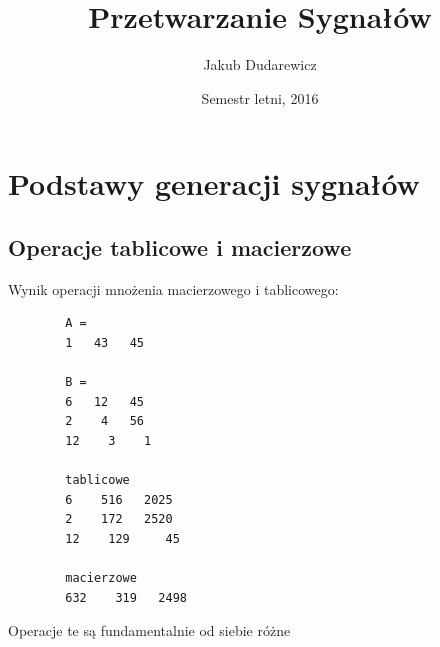\documentclass[12pt,titlepage]{report}
\title{Przetwarzanie Sygnałów}
\author{Jakub Dudarewicz}
\date{Semestr letni, 2016}
\begin{document}
\begin{titlepage}
	\maketitle
\end{titlepage}
	
	\def\thesection{Instrukcja \arabic{section}.\Large}
	\def\thesubsection{Instrukcja \arabic{section}, zadanie \arabic{subsection}\normalsize}
	\def\theparagraph{\normalsize}%
\section{Podstawy generacji sygnałów}
\subsection{Operacje tablicowe i macierzowe}

Wynik operacji mnożenia macierzowego i tablicowego:
\begin{multicols}{2}
	{
		\small
		\begin{verbatim}
		A =		
		1   43   45
		
		B =		
		6   12   45
		2    4   56
		12    3    1
		
		tablicowe
		6    516   2025
		2    172   2520
		12    129     45
		
		macierzowe
		632    319   2498
		\end{verbatim}
	}
\end{multicols}
Operacje te są fundamentalnie od siebie różne
\end{document}
